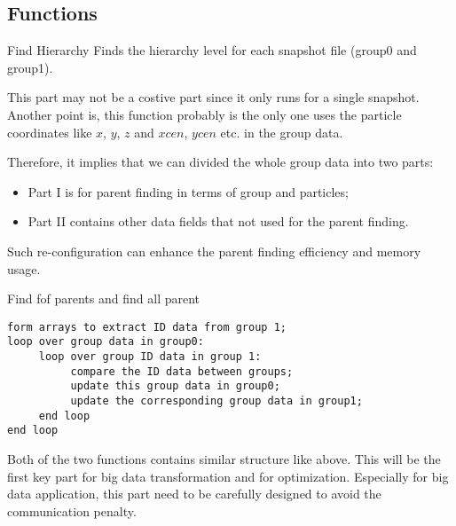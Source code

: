 \documentclass[notheorems, aspectratio=54]{beamer}
\begin{document}
\subsection{Functions}
\begin{frame}[fragile]

\begin{block}{Find Hierarchy}
 Finds the hierarchy level for each snapshot file (group0 and group1). 
\end{block}
This part may not be a costive part since it only runs for a single snapshot. Another point is, this function probably
is the only one uses the particle coordinates like $x$, $y$, $z$ and $xcen$, $ycen$ etc. in the group data.

Therefore, it implies that we can divided the whole group data into two parts:
\begin{itemize}
 \item Part I is for parent finding in terms of group and particles;
 \item Part II contains other data fields that not used for the parent finding. 
\end{itemize}
Such re-configuration can enhance the parent finding efficiency and memory usage.


\end{frame}

\begin{frame}[fragile]

\begin{block}{Find fof parents and find all parent}
 \begin{verbatim}
form arrays to extract ID data from group 1;
loop over group data in group0:
     loop over group ID data in group 1:
          compare the ID data between groups;
          update this group data in group0;
          update the corresponding group data in group1;
     end loop
end loop
 \end{verbatim}
\end{block}
Both of the two functions contains similar structure like above. This will be the first key part for big data transformation
and for optimization. Especially for big data application, this part need to be carefully designed to avoid the communication 
penalty.

\end{frame}
\end{document}

